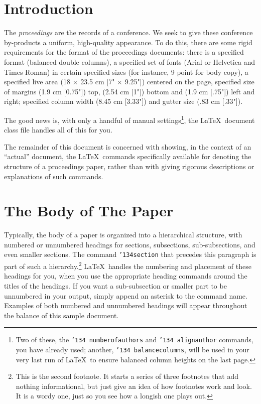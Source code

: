 \documentclass{edm_article}
\begin{document}
\section{Introduction}
The \textit{proceedings} are the records of a conference.
We seek to give these conference by-products a uniform,
high-quality appearance.  To do this, there are some rigid
requirements for the format of the proceedings documents: there
is a specified format (balanced  double columns), a specified
set of fonts (Arial or Helvetica and Times Roman) in
certain specified sizes (for instance, 9 point for body copy),
a specified live area (18 $\times$ 23.5 cm [7" $\times$ 9.25"]) centered on
the page, specified size of margins (1.9 cm [0.75"]) top, (2.54 cm [1"]) bottom
and (1.9 cm [.75"]) left and right; specified column width
(8.45 cm [3.33"]) and gutter size (.83 cm [.33"]).

The good news is, with only a handful of manual
settings\footnote{Two of these, the {\texttt{\char'134 numberofauthors}}
and {\texttt{\char'134 alignauthor}} commands, you have
already used; another, {\texttt{\char'134 balancecolumns}}, will
be used in your very last run of \LaTeX\ to ensure
balanced column heights on the last page.}, the \LaTeX\ document
class file handles all of this for you.

The remainder of this document is concerned with showing, in
the context of an ``actual'' document, the \LaTeX\ commands
specifically available for denoting the structure of a
proceedings paper, rather than with giving rigorous descriptions
or explanations of such commands.

\section{The {\secit Body} of The Paper}
Typically, the body of a paper is organized
into a hierarchical structure, with numbered or unnumbered
headings for sections, subsections, sub-subsections, and even
smaller sections.  The command \texttt{{\char'134}section} that
precedes this paragraph is part of such a
hierarchy.\footnote{This is the second footnote.  It
starts a series of three footnotes that add nothing
informational, but just give an idea of how footnotes work
and look. It is a wordy one, just so you see
how a longish one plays out.} \LaTeX\ handles the numbering
and placement of these headings for you, when you use
the appropriate heading commands around the titles
of the headings.  If you want a sub-subsection or
smaller part to be unnumbered in your output, simply append an
asterisk to the command name.  Examples of both
numbered and unnumbered headings will appear throughout the
balance of this sample document.
\end{document}
